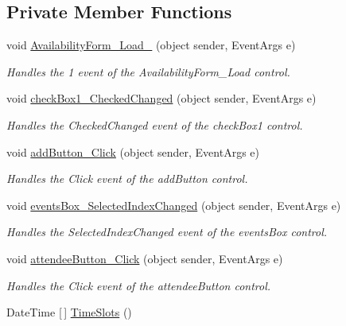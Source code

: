 \subsection*{Private Member Functions}
\begin{DoxyCompactItemize}
\item 
void \hyperlink{classProject1_1_1AvailabilityForm_a81c994e26bad20a9a3117f921df3ddd6}{Availability\+Form\+\_\+\+Load\+\_} (object sender, Event\+Args e)
\begin{DoxyCompactList}\small\item\em Handles the 1 event of the Availability\+Form\+\_\+\+Load control. \end{DoxyCompactList}\item 
void \hyperlink{classProject1_1_1AvailabilityForm_ad48d58c06771dc092941ebbeea059895}{check\+Box1\+\_\+\+Checked\+Changed} (object sender, Event\+Args e)
\begin{DoxyCompactList}\small\item\em Handles the Checked\+Changed event of the check\+Box1 control. \end{DoxyCompactList}\item 
void \hyperlink{classProject1_1_1AvailabilityForm_a4e66b612387c8207da934e1667947063}{add\+Button\+\_\+\+Click} (object sender, Event\+Args e)
\begin{DoxyCompactList}\small\item\em Handles the Click event of the add\+Button control. \end{DoxyCompactList}\item 
void \hyperlink{classProject1_1_1AvailabilityForm_a1ad0da6ac770635494b441c775a4f0d5}{events\+Box\+\_\+\+Selected\+Index\+Changed} (object sender, Event\+Args e)
\begin{DoxyCompactList}\small\item\em Handles the Selected\+Index\+Changed event of the events\+Box control. \end{DoxyCompactList}\item 
void \hyperlink{classProject1_1_1AvailabilityForm_aefcd030d389cf6e1882c74d171de373a}{attendee\+Button\+\_\+\+Click} (object sender, Event\+Args e)
\begin{DoxyCompactList}\small\item\em Handles the Click event of the attendee\+Button control. \end{DoxyCompactList}\item 
Date\+Time \mbox{[}$\,$\mbox{]} \hyperlink{classProject1_1_1AvailabilityForm_ae17fdf43349c4e89983592435fc0cc16}{Time\+Slots} ()

\end{DoxyCompactItemize}
